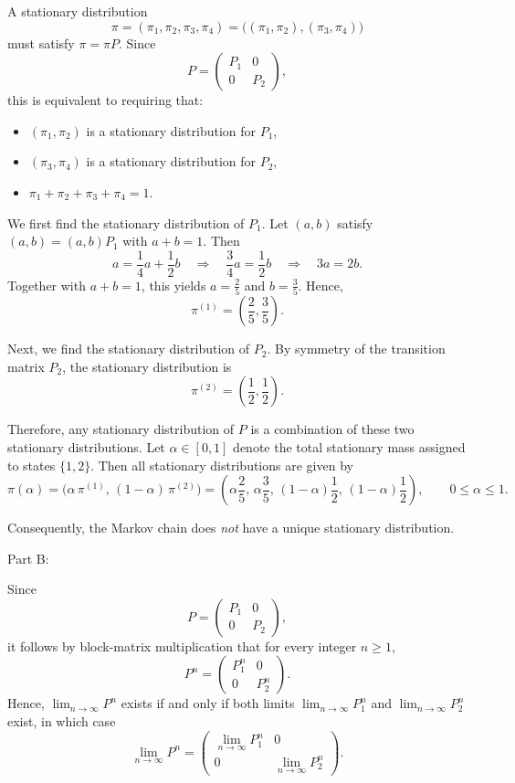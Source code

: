 \documentclass[hidelinks]{article}
\begin{document}
\noindent A stationary distribution
\[
\pi = (\pi_1,\pi_2,\pi_3,\pi_4)
= \big((\pi_1,\pi_2),(\pi_3,\pi_4)\big)
\]
must satisfy \(\pi=\pi P\). Since
\[
P=
\begin{pmatrix}
P_1 & 0\\
0 & P_2
\end{pmatrix},
\]
this is equivalent to requiring that:
\begin{itemize}
\item \((\pi_1,\pi_2)\) is a stationary distribution for \(P_1\),
\item \((\pi_3,\pi_4)\) is a stationary distribution for \(P_2\),
\item \(\pi_1+\pi_2+\pi_3+\pi_4=1\).
\end{itemize}

\smallskip

\noindent We first find the stationary distribution of \(P_1\). Let \((a,b)\) satisfy
\((a,b)=(a,b)P_1\) with \(a+b=1\). Then
\[
a=\frac14 a+\frac12 b
\quad\Longrightarrow\quad
\frac34 a=\frac12 b
\quad\Longrightarrow\quad
3a=2b.
\]
Together with \(a+b=1\), this yields \(a=\frac25\) and \(b=\frac35\). Hence,
\[
\pi^{(1)}=\left(\frac25,\frac35\right).
\]

\smallskip

\noindent Next, we find the stationary distribution of \(P_2\). By symmetry of the transition
matrix \(P_2\), the stationary distribution is
\[
\pi^{(2)}=\left(\frac12,\frac12\right).
\]

\smallskip

\noindent Therefore, any stationary distribution of \(P\) is a combination of these two
stationary distributions. Let \(\alpha\in[0,1]\) denote the total stationary mass assigned
to states \(\{1,2\}\). Then all stationary distributions are given by
\[
\pi(\alpha)
=
\big(
\alpha\,\pi^{(1)},\,
(1-\alpha)\,\pi^{(2)}
\big)
=
\left(
\alpha\frac25,\,
\alpha\frac35,\,
(1-\alpha)\frac12,\,
(1-\alpha)\frac12
\right),
\qquad 0\le \alpha\le 1.
\]

\smallskip

\noindent Consequently, the Markov chain does \emph{not} have a unique stationary distribution.

\medskip

\noindent Part B:

\noindent Since
\[
P=\begin{pmatrix}
P_1 & 0\\
0 & P_2
\end{pmatrix},
\]
it follows by block-matrix multiplication that for every integer $n\ge 1$,
\[
P^n=\begin{pmatrix}
P_1^n & 0\\
0 & P_2^n
\end{pmatrix}.
\]
Hence, $\lim_{n\to\infty}P^n$ exists if and only if both limits
$\lim_{n\to\infty}P_1^n$ and $\lim_{n\to\infty}P_2^n$ exist, in which case
\[
\lim_{n\to\infty}P^n
=
\begin{pmatrix}
\lim_{n\to\infty}P_1^n & 0\\
0 & \lim_{n\to\infty}P_2^n
\end{pmatrix}.
\]
\end{document}
